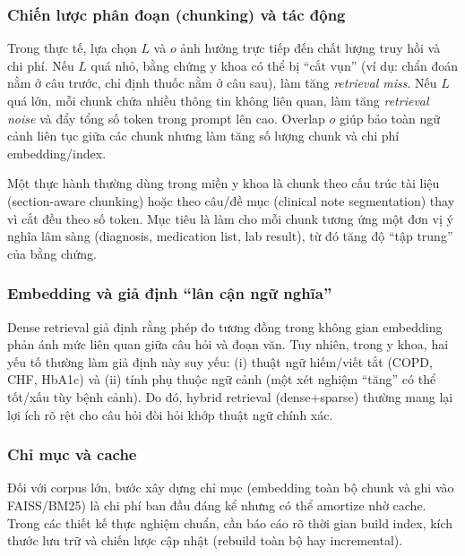 \documentclass[a4paper,12pt,twoside]{report}
\begin{document}
\subsubsection{Chiến lược phân đoạn (chunking) và tác động}
Trong thực tế, lựa chọn \(L\) và \(o\) ảnh hưởng trực tiếp đến chất lượng truy hồi và chi phí. Nếu \(L\) quá nhỏ, bằng chứng y khoa có thể bị ``cắt vụn'' (ví dụ: chẩn đoán nằm ở câu trước, chỉ định thuốc nằm ở câu sau), làm tăng \textit{retrieval miss}. Nếu \(L\) quá lớn, mỗi chunk chứa nhiều thông tin không liên quan, làm tăng \textit{retrieval noise} và đẩy tổng số token trong prompt lên cao. Overlap \(o\) giúp bảo toàn ngữ cảnh liên tục giữa các chunk nhưng làm tăng số lượng chunk và chi phí embedding/index.

Một thực hành thường dùng trong miền y khoa là chunk theo cấu trúc tài liệu (section-aware chunking) hoặc theo câu/đề mục (clinical note segmentation) thay vì cắt đều theo số token. Mục tiêu là làm cho mỗi chunk tương ứng một đơn vị ý nghĩa lâm sàng (diagnosis, medication list, lab result), từ đó tăng độ ``tập trung'' của bằng chứng.

\subsubsection{Embedding và giả định ``lân cận ngữ nghĩa''}
Dense retrieval giả định rằng phép đo tương đồng trong không gian embedding phản ánh mức liên quan giữa câu hỏi và đoạn văn. Tuy nhiên, trong y khoa, hai yếu tố thường làm giả định này suy yếu: (i) thuật ngữ hiếm/viết tắt (COPD, CHF, HbA1c) và (ii) tính phụ thuộc ngữ cảnh (một xét nghiệm ``tăng'' có thể tốt/xấu tùy bệnh cảnh). Do đó, hybrid retrieval (dense+sparse) thường mang lại lợi ích rõ rệt cho câu hỏi đòi hỏi khớp thuật ngữ chính xác.

\subsubsection{Chỉ mục và cache}
Đối với corpus lớn, bước xây dựng chỉ mục (embedding toàn bộ chunk và ghi vào FAISS/BM25) là chi phí ban đầu đáng kể nhưng có thể amortize nhờ cache. Trong các thiết kế thực nghiệm chuẩn, cần báo cáo rõ thời gian build index, kích thước lưu trữ và chiến lược cập nhật (rebuild toàn bộ hay incremental).
\end{document}
